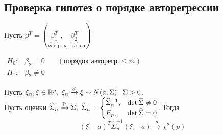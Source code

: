 \subsection{Проверка гипотез о порядке авторегрессии}

Пусть $\beta^T=(\underbrace{\beta_1^T}_{m\text{ в-р}},\underbrace{\beta_2^T}_{p-m\text{ в-р}})$

\(
\begin{array}{ccc}
    H_0:& \beta_2=0& \quad (\text{порядок авторегр.}\leq m)\\
    H_1:& \beta_2\neq0&
\end{array}
\)
\begin{lemma} \label{lm::sigma_conv}
    Пусть $\xi_n,\xi\in\mathbb{R}^p,\ \xi_n\xrightarrow{d}\xi\sim N(a,\Sigma),\ \Sigma>0$. \\
    Пусть оценки
    \(\widehat{\Sigma}_n\xrightarrow{\P}\Sigma,\ 
      \widetilde{\Sigma}_n=\begin{cases}
        \widehat{\Sigma}^{-1}_n,& \det\widehat{\Sigma}\neq0 \\
        E_p,& \det\widehat{\Sigma}=0
    \end{cases}\).
    Тогда
    \[(\xi-a)^T\widehat{\Sigma}^{-1}_n(\xi-a)\xrightarrow{d}\chi^2(p)\]
\end{lemma}

